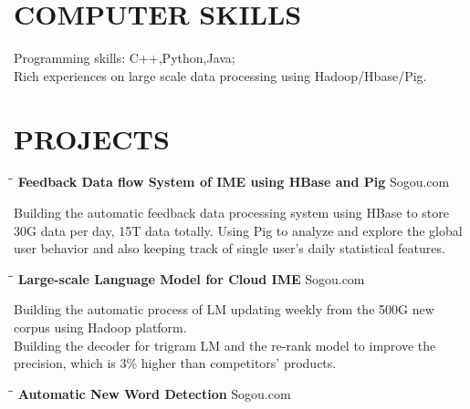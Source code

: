 \documentclass{res}
\begin{document}
\begin{resume}
\section{COMPUTER SKILLS}          
    Programming skills: C++,Python,Java;\\
    Rich experiences on large scale data processing using Hadoop/Hbase/Pig.
 
\section{PROJECTS}
   \vspace{-0.1in}	
   \begin{tabbing}
   \hspace{2.5in}\= \hspace{3in}\= \kill %
    {\bf Feedback Data flow System of IME using HBase and Pig}\> \>Sogou.com     \\
   \end{tabbing}\vspace{-20pt}      %
   Building the automatic feedback data processing system using HBase to store 30G data per day, 15T data totally. Using Pig to analyze and explore the global user behavior and also keeping track of single user's daily statistical features. 
   \begin{tabbing}
   \hspace{2.5in}\= \hspace{3in}\= \kill %
    {\bf Large-scale Language Model for Cloud IME} \> \>Sogou.com     \\
   \end{tabbing}\vspace{-20pt}      %
   Building the automatic process of LM updating weekly from the 500G new corpus using Hadoop platform. \\
   Building the decoder for trigram LM and the re-rank model to improve the precision, which is 3\% higher than competitors' products.
   \begin{tabbing}
   \hspace{2.5in}\= \hspace{3in}\= \kill %
    {\bf Automatic New Word Detection}\> \>Sogou.com     \\
   \end{tabbing}\vspace{-20pt}      %

\end{resume}
\end{document}
